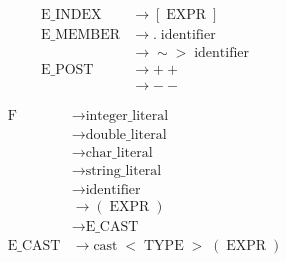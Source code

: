 \begin{align*}
\text{E\_INDEX}
  &\to [\;\text{EXPR}\;]\\[6pt]
\text{E\_MEMBER}
  &\to .\;\text{identifier}\\
  &\to \sim>\;\text{identifier}\\[6pt]
\text{E\_POST}
  &\to ++\\
  &\to --
\end{align*}

\begin{align*}
\text{F}
  &\to \text{integer\_literal}\\
  &\to \text{double\_literal}\\
  &\to \text{char\_literal}\\
  &\to \text{string\_literal}\\
  &\to \text{identifier}\\
  &\to (\;\text{EXPR}\;)\\
  &\to \text{E\_CAST}\\[6pt]
\text{E\_CAST}
  &\to \text{cast}\;<\;\text{TYPE}\;>\;(\;\text{EXPR}\;)
\end{align*}
